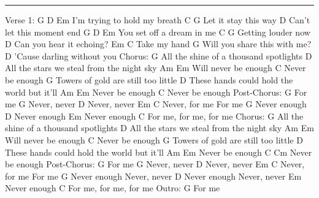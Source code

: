 \noindent\rule{\columnwidth}{1pt}


\begin{multicols}{2}
\begin{lstsong}
Verse 1:
G             D           Em
I'm trying to hold my breath
        C        G
Let it stay this way
       D
Can't let this moment end
G             D        Em
You set off a dream in me
         C     G
Getting louder now
        D
Can you hear it echoing?
Em           C
Take my hand
                        G
Will you share this with me?
                   D
'Cause darling without you
Chorus:
G
All the shine of a thousand spotlights
D
All the stars we steal from the night sky
Am            Em
Will never be enough
C
Never be enough
G
Towers of gold are still too little
      D
These hands could hold the world but it'll
Am       Em
Never be enough
C
Never be enough
Post-Chorus:
G
For me
G
Never, never
D
Never, never
Em         C
Never, for me
For me
G
Never enough
D
Never enough
Em
Never enough
    C
For me, for me, for me
Chorus:
G
All the shine of a thousand spotlights
D
All the stars we steal from the night sky
    Am        Em
Will never be enough
C
Never be enough
G
Towers of gold are still too little
      D
These hands could hold the world but it'll
Am         Em
Never be enough
C             Cm
Never be enough
Post-Chorus:
G
For me
G
Never, never
D
Never, never
Em          C
Never, for me
For me
G
Never enough
Never, never
D
Never enough
Never, never
Em
Never enough
    C
For me, for me, for me
Outro:
G
For me
\end{lstsong}
\end{multicols}
\newpage


